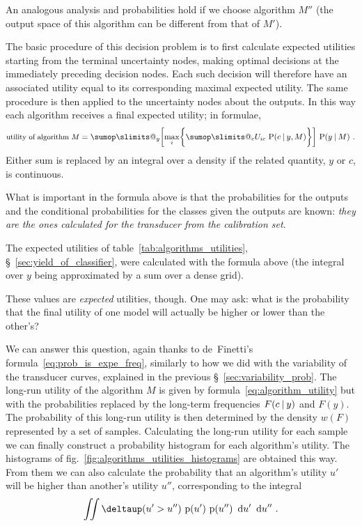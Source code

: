 \documentclass[a4paper,12pt,%
onecolumn,oneside,article,%
british%
]{memoir}
\makeatletter
\def\sum{\DOTSI\sumop\slimits@}
\newcommand*{\delt}{\deltaup}%
\newcommand*{\di}{\mathop{}\!\mathrm{d}}%
\DeclarePairedDelimiter\set{\{}{\}} %
\newcommand*{\p}{\mathrm{p}}%
\renewcommand*{\P}{\mathrm{P}}%
\renewcommand*{\|}[1][]{\nonscript\:#1\vert\nonscript\:\mathopen{}}
\newcommand*{\sect}{\S}%
\newcommand*{\fig}{fig.}%
\newcommand*{\wf}{w}
\newcommand*{\texts}[1]{\text{\small #1}}
\makeatother
\begin{document}
An analogous analysis and probabilities hold if we choose algorithm $M''$ (the output space of this algorithm can be different from that of $M'$).

The basic procedure of this decision problem is to first calculate expected utilities starting from the terminal uncertainty nodes, making optimal decisions at the immediately preceding decision nodes. Each such decision will therefore have an associated utility equal to its corresponding maximal expected utility. The same procedure is then applied to the uncertainty nodes about the outputs. In this way each algorithm receives a final expected utility; in formulae,
\begin{equation}
  \label{eq:algorithm_utility}
\texts{utility of algorithm $M$} =  \sum_{y} \biggl[\max_{i}\set[\bigg]{\sum_{c} U_{ic}\ \P(c \| y, M)}\biggr]\
  \P(y \| M) \ .
\end{equation}
Either sum is replaced by an integral over a density if the related quantity, $y$ or $c$, is continuous.

What is important in the formula above is that the probabilities for the outputs and the conditional probabilities for the classes given the outputs are known: \emph{they are the ones calculated for the transducer from the calibration set}.

The expected utilities of table~\ref{tab:algorithms_utilities}, \sect~\ref{sec:yield_of_classifier}, were calculated with the formula above (the integral over $y$ being approximated by a sum over a dense grid).

\medskip

These values are \emph{expected} utilities, though. One may ask: what is the probability that the final utility of one model will actually be higher or lower than the other's?

We can answer this question, again thanks to de~Finetti's formula~\eqref{eq:prob_is_expe_freq}, similarly to how we did with the variability of the transducer curves, explained in the previous \sect~\ref{sec:variability_prob}. The long-run utility of the algorithm $M$ is given by formula~\eqref{eq:algorithm_utility} but with the probabilities replaced by the long-term frequencies $F(c\|y)$ and $F(y)$. The probability of this long-run utility is then determined by the density $\wf(F)$ represented by a set of samples. Calculating the long-run utility for each sample we can finally construct a probability histogram for each algorithm's utility. The histograms of \fig~\ref{fig:algorithms_utilities_histograms} are obtained this way. From them we can also calculate the probability that an algorithm's utility $u'$ will be higher than another's utility $u''$, corresponding to the integral
\begin{equation}
  \label{eq:compare_alg_utilities}
\iint \delt(u' > u'')\ \p(u')\ \p(u'')\ \di u'\ \di u'' \ .
\end{equation}
\end{document}
